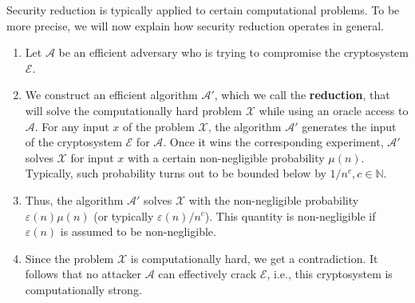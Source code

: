 \documentclass[../lecture-notes-148x210.tex]{subfiles}
\begin{document}
Security reduction is typically applied to certain computational problems. To be more precise, 
we will now explain how security reduction operates in general.
\begin{definition} 
    \hfill
    \begin{enumerate}
        \item Let $\mathcal{A}$ be an efficient adversary who is trying to
        compromise the cryptosystem $\mathcal{E}$.
        \item We construct an efficient algorithm $\mathcal{A}'$, which we call the
        \textbf{reduction}, that will solve the computationally hard problem
        $\mathcal{X}$ while using an oracle access to $\mathcal{A}$. For any
        input $x$ of the problem $\mathcal{X}$, the algorithm $\mathcal{A}'$
        generates the input of the cryptosystem $\mathcal{E}$ for $\mathcal{A}$.
        Once it wins the corresponding experiment, $\mathcal{A}'$ solves
        $\mathcal{X}$ for input $x$ with a certain non-negligible probability
        $\mu(n)$. Typically, such probability turns out to be bounded below by
        $1/n^c, c \in \mathbb{N}$.
        \item Thus, the algorithm $\mathcal{A}'$ solves $\mathcal{X}$ with the
        non-negligible probability $\varepsilon(n)\mu(n)$ (or typically
        $\varepsilon(n)/n^c$). This quantity is non-negligible 
        if $\varepsilon(n)$ is assumed to be non-negligible.
        \item Since the problem $\mathcal{X}$ is computationally hard, we get a
        contradiction. It follows that no attacker $\mathcal{A}$ can effectively
        crack $\mathcal{E}$, i.e., this cryptosystem is computationally strong.
    \end{enumerate}
\end{definition}


\end{document}
